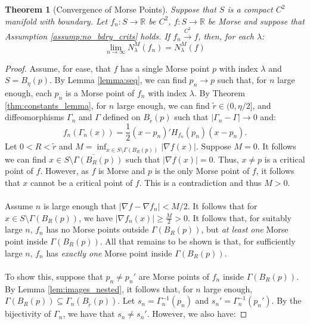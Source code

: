 \documentclass[11pt]{article}
\newcommand{\1}{\mathbf{1}}
\newtheorem{thm}{Theorem}%
\theoremstyle{definition}
\theoremstyle{remark}
\begin{document}
\begin{mdframed}
    \begin{thm}[Convergence of Morse Points]\label{thm:morse}
         Suppose that $S$ is a compact $C^2$ manifold with boundary. Let $f_n:S\rightarrow \mathbb{R}$ be $C^2$, $f:S\rightarrow \mathbb{R}$ be Morse and suppose that Assumption \ref{assump:no_bdry_crits} holds. If $f_n\xrightarrow{C^2}f$, then, for each $\lambda$: 
        \begin{equation*}
            \lim_{n\rightarrow \infty} N^M_\lambda(f_n) = N^M_\lambda(f)
        \end{equation*}
    \end{thm}
    \vspace*{0.3mm}
\end{mdframed}
\begin{proof} Assume, for ease, that $f$ has a single Morse point $p$ with index $\lambda$ and $S=B_\eta(p)$. By Lemma \ref{lemma:seq}, we can find $p_n\rightarrow p$ such that, for $n$ large enough, each $p_n$ is a Morse point of $f_n$ with index $\lambda$. By Theorem \ref{thm:constants_lemma}, for $n$ large enough, we can find $\tilde{r}\in(0,\eta/2]$, and diffeomorphisms $\Gamma_n$ and $\Gamma$ defined on $B_{\tilde{r}}(p)$ such that $|\Gamma_n-\Gamma|\rightarrow 0$ and:
\begin{equation}\nonumber
    f_n(\Gamma_n(x)) = \frac{1}{2}(x-p_n)'H_{f_n}(p_n)(x-p_n).  
\end{equation}
Let $0<R<\tilde{r}$ and $M= \inf_{x \in S \setminus \Gamma(B_{R}(p))}|\nabla f(x)|$. Suppose $M=0$. It follows we can find $x \in \overline{S \setminus \Gamma(B_{R}(p))}$ such that $|\nabla f(x)|=0$. Thus, $x\neq p$ is a critical point of $f$. However, as $f$ is Morse and $p$ is the only Morse point of $f$, it follows that $x$ cannot be a critical point of $f$. This is a contradiction and thus $M>0$.\\
\\
Assume $n$ is large enough that $|\nabla f-\nabla f_n|< M/2$. It follows that for $x \in S \setminus\Gamma(B_{R}(p))$, we have $|\nabla f_n (x)| \geq \frac{M}{2} > 0$. It follows that, for suitably large $n$, $f_n$ has no Morse points outside $\Gamma(B_{R}(p))$, but \textit{at least one} Morse point inside $\Gamma(B_{R}(p))$. All that remains to be shown is that, for sufficiently large $n$, $f_n$ has \textit{exactly one} Morse point inside $\Gamma(B_{R}(p))$. \\
\\
To show this, suppose that $p_n\neq p_n'$ are Morse points of $f_n$ inside $\Gamma(B_{R}(p))$. By Lemma \ref{lem:images_nested}, it follows that, for $n$ large enough, $\Gamma(B_{R}(p))\subseteq \Gamma_n(B_{\tilde{r}}(p))$. Let $s_n = \Gamma_n^{-1}(p_n)$ and $s_n'= \Gamma_n^{-1}(p_n')$. By the bijectivity of $\Gamma_n$, we have that $s_n\neq s_n'$. However, we also have:

\end{proof}
\end{document}
